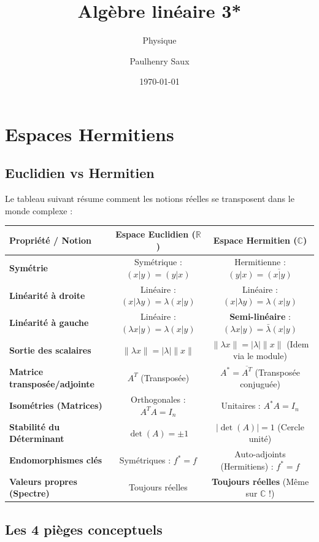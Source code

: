 \documentclass[french]{yLectureNote}
\title{Algèbre linéaire 3*}
\subtitle{Physique}
\author{Paulhenry Saux}
\date{\today}
\begin{document}
\setcounter{chapter}{2}
\chapter{Espaces Hermitiens}
\section{Euclidien vs Hermitien}

Le tableau suivant résume comment les notions réelles se transposent dans le monde complexe :

\begin{center}
\begin{tabular}{|l|c|c|}
\hline
\textbf{Propriété / Notion} & \textbf{Espace Euclidien ($\mathbb{R}$)} & \textbf{Espace Hermitien ($\mathbb{C}$)} \\ \hline
\textbf{Symétrie} & Symétrique : $(x|y) = (y|x)$ & Hermitienne : $(y|x) = \overline{(x|y)}$ \\ \hline
\textbf{Linéarité à droite} & Linéaire : $(x|\lambda y) = \lambda(x|y)$ & Linéaire : $(x|\lambda y) = \lambda(x|y)$ \\ \hline
\textbf{Linéarité à gauche} & Linéaire : $(\lambda x|y) = \lambda(x|y)$ & \textbf{Semi-linéaire} : $(\lambda x|y) = \bar{\lambda}(x|y)$ \\ \hline
\textbf{Sortie des scalaires} & $\|\lambda x\| = |\lambda| \|x\|$ & $\|\lambda x\| = |\lambda| \|x\|$ (Idem via le module) \\ \hline
\textbf{Matrice transposée/adjointe} & $A^T$ (Transposée) & $A^* = \overline{A^T}$ (Transposée conjuguée) \\ \hline
\textbf{Isométries (Matrices)} & Orthogonales : $A^T A = I_n$ & Unitaires : $A^* A = I_n$ \\ \hline
\textbf{Stabilité du Déterminant} & $\det(A) = \pm 1$ & $|\det(A)| = 1$ (Cercle unité) \\ \hline
\textbf{Endomorphismes clés} & Symétriques : $f^* = f$ & Auto-adjoints (Hermitiens) : $f^* = f$ \\ \hline
\textbf{Valeurs propres (Spectre)} & Toujours réelles & \textbf{Toujours réelles} (Même sur $\mathbb{C}$ !) \\ \hline
\end{tabular}
\end{center}

\section{Les 4 pièges conceptuels}
\end{document}
